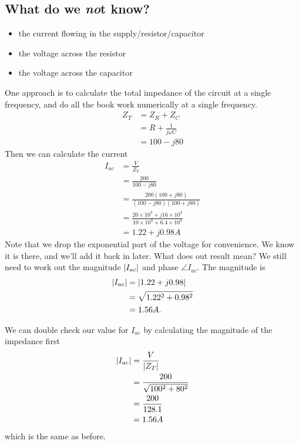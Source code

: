 \documentclass{tufte-handout}
\newcommand{\iac}{I_{ac}}%
\begin{document}
\subsection{What do we \emph{no}t know?}
\begin{itemize}
\item the current flowing in the supply/resistor/capacitor
\item the voltage across the resistor
\item the voltage across the capacitor
\end{itemize}

One approach is to calculate the total impedance of the circuit at a single frequency, and do all the book work numerically at a single frequency.
\begin{align}
Z_T &= Z_R + Z_C \\ 
& = R + \frac{1}{j\omega C} \\
& = 100 - j80
\end{align}
Then we can calculate the current 
\begin{align}
\iac &= \frac{V}{Z_T}\\
&= \frac{200}{100-j80}\\
&= \frac{200(100+j80)}{(100-j80)(100+j80)}\\
& = \frac{20\times10^3+j16\times10^3}{10\times10^3 + 6.4\times10^3} \\
& = 1.22 + j0.98 A
\end{align}
Note that we drop the exponential part of the voltage for convenience. We know it is there, and we'll add it back in later.
What does out result mean? We still need to work out the magnitude $\abs{\iac}$ and phase $\angle{\iac}$. The magnitude is
\begin{align}
\abs{\iac} &= \abs{1.22 + j0.98} \\
&= \sqrt{1.22^2 + 0.98^2} \\
&= 1.56 A.
\end{align}

We can double check our value for $\iac$ by calculating the magnitude of the impedance first
\begin{align}
\abs{\iac} &= \frac{V}{\abs{Z_T}} \\
&= \frac{200}{\sqrt{100^2 + 80^2}} \\
& = \frac{200}{128.1} \\
& = 1.56A
\end{align}
which is the same as before.
\end{document}
